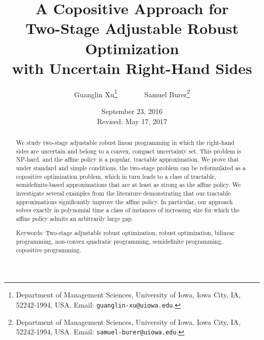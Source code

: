 \documentclass[12pt]{article}
\title{A Copositive Approach for \\ Two-Stage Adjustable Robust
Optimization \\ with Uncertain Right-Hand Sides}
\author{%
Guanglin Xu\thanks{Department of Management Sciences, University of Iowa,
Iowa City, IA, 52242-1994, USA. Email: {\tt guanglin-xu@uiowa.edu}.}%
\ \ \ \ \ \ \
Samuel Burer\thanks{Department of Management Sciences, University of Iowa,
Iowa City, IA, 52242-1994, USA. Email: {\tt samuel-burer@uiowa.edu}.}%
}
\date{September 23, 2016 \\ Revised: May 17, 2017}
\begin{document}
\maketitle

\begin{abstract}

\noindent We study two-stage adjustable robust linear programming
in which the right-hand sides are uncertain and belong to a convex,
compact uncertainty set. This problem is NP-hard, and the affine policy
is a popular, tractable approximation. We prove that under standard
and simple conditions, the two-stage problem can be reformulated as
a copositive optimization problem, which in turn leads to a class of
tractable, semidefinite-based approximations that are at least as
strong as the affine policy. We investigate several examples from the
literature demonstrating that our tractable approximations significantly
improve the affine policy. In particular, our approach solves exactly in
polynomial time a class of instances of increasing size for which the
affine policy admits an arbitrarily large gap.

\mbox{}

\noindent Keywords: Two-stage adjustable robust optimization,
robust optimization, bilinear programming, non-convex quadratic
programming, semidefinite programming, copositive programming.

\end{abstract}
\end{document}
